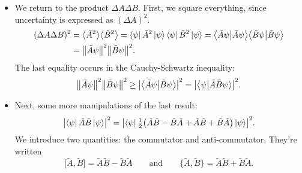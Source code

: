 \documentclass[11pt, a4paper]{article}
\newcommand{\eqtext}[1]{\qquad \text{#1} \qquad}
\newcommand{\bbraket}[2]{\big \langle {#1} \big | {#2} \big \rangle}  %
\begin{document}
\begin{itemize}
	\item We return to the product $ \Delta A \Delta B $. First, we square everything, since uncertainty is expressed as $ (\Delta A)^{2} $. 
	\begin{align*}
		(\Delta A \Delta B)^{2} &= \big\langle \tilde{A}^{2} \big\rangle \big\langle \tilde{B}^{2} \big\rangle = \bra{\psi}\tilde{A}^{2}\ket{\psi} \bra{\psi}\tilde{B}^{2}\ket{\psi} = \bbraket{\tilde{A}\psi}{\tilde{A}\psi}\bbraket{\tilde{B}\psi}{\tilde{B}\psi}\\
		&= \norm{\tilde{A}\psi}^{2}\norm{\tilde{B}\psi}^{2}.
	\end{align*}
	The last equality occurs in the Cauchy-Schwartz inequality:
	\begin{equation*}
		\norm{\tilde{A}\psi}^{2}\norm{\tilde{B}\psi}^{2} \geq \abs{\bbraket{\tilde{A}\psi}{\tilde{B}\psi}}^{2} = \abs{\bbraket{\psi}{\tilde{A}\tilde{B}\psi}}^{2}.
	\end{equation*}
	
	\item Next, some more manipulations of the last result:
	\begin{equation*}
		 \abs{\bra{\psi}\tilde{A}\tilde{B}\ket{\psi}}^{2} = \abs{\bra{\psi}\tfrac{1}{2}\big(\tilde{A}\tilde{B} - \tilde{B}\tilde{A} + \tilde{A}\tilde{B} + \tilde{B}\tilde{A}\big)\ket{\psi} }^{2}.
	\end{equation*}
	We introduce two quantities: the commutator and anti-commutator. They're written
	\begin{equation*}
		\big[\tilde{A}, \tilde{B}\big] = \tilde{A}\tilde{B} - \tilde{B}\tilde{A} \eqtext{and} \big\{\tilde{A}, \tilde{B}\big\} = \tilde{A}\tilde{B} + \tilde{B}\tilde{A}.
	\end{equation*} 
\end{itemize}
\end{document}
